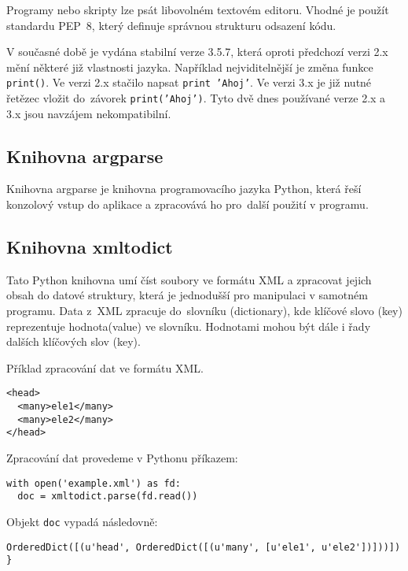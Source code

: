 Programy nebo skripty lze psát libovolném textovém editoru. Vhodné je
použít standardu PEP~8, který definuje správnou strukturu odsazení kódu.

V současné době je vydána stabilní verze 3.5.7, která oproti předchozí
verzi 2.x mění některé již  vlastnosti jazyka. Například 
nejviditelnější je změna funkce {\tt print()}. Ve verzi 2.x stačilo napsat
 {\tt print 'Ahoj'}. Ve verzi 3.x je již nutné řetězec vložit
do~závorek  {\tt print('Ahoj')}. Tyto dvě dnes používané verze 2.x
a 3.x jsou navzájem nekompatibilní.
\cite{python} 
\cite{wikiPython} 
  
\subsection{Knihovna argparse}
\label{argparse} 
Knihovna argparse je knihovna 
programovacího jazyka Python, která řeší konzolový vstup do aplikace a 
zpracovává ho pro~další použití v programu.\cite{argparse}

\subsection{Knihovna xmltodict}
\label{xmltodict} 
Tato Python knihovna umí číst soubory ve formátu XML a zpracovat jejich obsah do datové struktury, která je jednodušší pro manipulaci v samotném
programu. Data z~XML zpracuje do~slovníku (dictionary), kde klíčové slovo (key) reprezentuje hodnota(value) ve slovníku.
Hodnotami mohou být dále i řady dalších klíčových slov (key).\cite{xmltodict}

Příklad zpracování dat ve formátu XML.

{\scriptsize
\begin{lstlisting}
<head>
  <many>ele1</many>
  <many>ele2</many>
</head>
\end{lstlisting}
}

Zpracování dat provedeme v Pythonu příkazem:

{\scriptsize
\lstset{language=Python}
\begin{lstlisting}
with open('example.xml') as fd: 
  doc = xmltodict.parse(fd.read()) 
\end{lstlisting}
}

Objekt {\tt doc} vypadá následovně:

{\scriptsize
\lstset{language=Python}
\begin{lstlisting}
OrderedDict([(u'head', OrderedDict([(u'many', [u'ele1', u'ele2'])]))]) }
\end{lstlisting}
}

